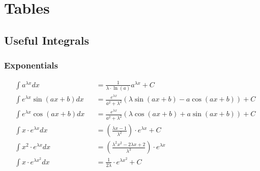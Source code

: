 \section{Tables}
\subsection{Useful Integrals}
\subsubsection{Exponentials}
\begin{footnotesize}
    \noindent\begin{align*}
         & \int a^{\lambda x}dx           &  & =\frac{1}{\lambda \cdot \ln(a)}a^{\lambda x}+C                                     \\
         & \int e^{\lambda x}\sin(ax+b)dx &  & =\frac{e^{\lambda x}}{a^2+\lambda ^2}\left(\lambda \sin(ax+b)-a\cos(ax+b)\right)+C \\
         & \int e^{\lambda x}\cos(ax+b)dx &  & =\frac{e^{\lambda x}}{a^2+\lambda ^2}\left(\lambda \cos(ax+b)+a\sin(ax+b)\right)+C \\
         & \int x \cdot e^{\lambda x}dx   &  & =(\frac{\lambda x-1}{\lambda ^2})\cdot e^{\lambda x}+C                             \\
         & \int x^2 \cdot e^{\lambda x}dx &  & =(\frac{\lambda ^2x^2-2\lambda x+2}{\lambda ^3})\cdot e^{\lambda x}                \\
         & \int x\cdot e^{\lambda x^2}dx  &  & =\frac{1}{2\lambda}\cdot e^{\lambda x^2}+C
    \end{align*}
\end{footnotesize}

